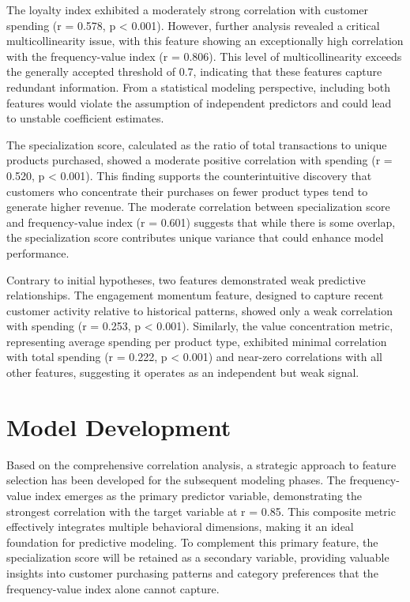 \documentclass[
]{article}
\begin{document}
The loyalty index exhibited a moderately strong correlation with
customer spending (r = 0.578, p \textless{} 0.001). However, further
analysis revealed a critical multicollinearity issue, with this feature
showing an exceptionally high correlation with the frequency-value index
(r = 0.806). This level of multicollinearity exceeds the generally
accepted threshold of 0.7, indicating that these features capture
redundant information. From a statistical modeling perspective,
including both features would violate the assumption of independent
predictors and could lead to unstable coefficient estimates.

The specialization score, calculated as the ratio of total transactions
to unique products purchased, showed a moderate positive correlation
with spending (r = 0.520, p \textless{} 0.001). This finding supports
the counterintuitive discovery that customers who concentrate their
purchases on fewer product types tend to generate higher revenue. The
moderate correlation between specialization score and frequency-value
index (r = 0.601) suggests that while there is some overlap, the
specialization score contributes unique variance that could enhance
model performance.

Contrary to initial hypotheses, two features demonstrated weak
predictive relationships. The engagement momentum feature, designed to
capture recent customer activity relative to historical patterns, showed
only a weak correlation with spending (r = 0.253, p \textless{} 0.001).
Similarly, the value concentration metric, representing average spending
per product type, exhibited minimal correlation with total spending (r =
0.222, p \textless{} 0.001) and near-zero correlations with all other
features, suggesting it operates as an independent but weak
signal.\newpage

\section{Model Development}\label{model-development}

Based on the comprehensive correlation analysis, a strategic approach to
feature selection has been developed for the subsequent modeling phases.
The frequency-value index emerges as the primary predictor variable,
demonstrating the strongest correlation with the target variable at r =
0.85. This composite metric effectively integrates multiple behavioral
dimensions, making it an ideal foundation for predictive modeling. To
complement this primary feature, the specialization score will be
retained as a secondary variable, providing valuable insights into
customer purchasing patterns and category preferences that the
frequency-value index alone cannot capture.
\end{document}
